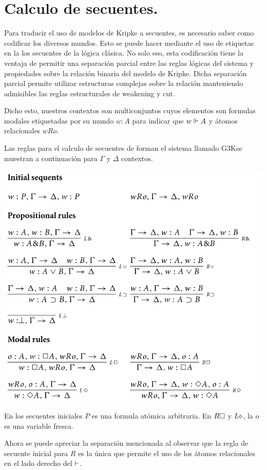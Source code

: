 \section{Calculo de secuentes.}


Para traducir el uso de modelos de Kripke a secuentes, es necesario saber como codificar los diversos mundos. Esto se puede hacer mediante el uso de etiquetas en la los secuentes de la lógica clásica. No solo eso, esta codificación tiene la ventaja de permitir una separación parcial entre las reglas lógicas del sistema y propiedades sobre la relación binaria del modelo de Kripke. Dicha separación parcial permite utilizar estructuras complejas sobre la relación manteniendo admisibles las reglas estructurales de weakening y cut.

Dicho esto, nuestros contextos son multiconjuntos cuyos elementos son formulas modales etiquetadas por su mundo $w:A$ para indicar que $w \Vdash A$ y átomos relacionales $wRo$.


Las reglas para el calculo de secuentes de \K forman el sistema llamado G3Kse muestran a continuación para $\Gamma$ y $\Delta$ contextos.


\includegraphics[width=\textwidth]{reglas} 

En los secuentes iniciales $P$ es una formula atómica arbitraria. 
En $R\square$ y $L\diamond$, la $o$ es una variable fresca.

Ahora se puede apreciar la separación mencionada al observar que la regla de secuente inicial para $R$ es la única que permite el uso de los átomos relacionales en el lado derecho del $\vdash$.



